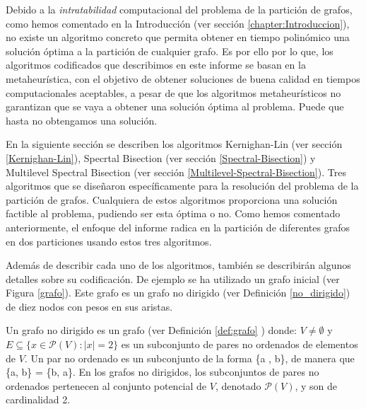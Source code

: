 Debido a la \textit{intratabilidad} computacional del problema de la partición de grafos, como hemos comentado en la Introducción (ver sección \ref{chapter:Introduccion}), no existe un algoritmo concreto que permita obtener en tiempo polinómico una solución óptima a la partición de cualquier grafo. Es por ello por lo que, los algoritmos codificados que describimos en este informe se basan en la metaheurística, con el objetivo de obtener soluciones de buena calidad en tiempos computacionales aceptables, a pesar de que los algoritmos metaheurísticos no garantizan que se vaya a obtener una solución óptima al problema. Puede que hasta no obtengamos una solución.

En la siguiente sección se describen los algoritmos Kernighan-Lin\cite{KernighanLin} (ver sección \ref{Kernighan-Lin}), Specrtal Bisection (ver sección \ref{Spectral-Bisection}) y Multilevel Spectral Bisection (ver sección \ref{Multilevel-Spectral-Bisection}). Tres algoritmos que se diseñaron específicamente para la resolución del problema de la partición de grafos. Cualquiera de estos algoritmos proporciona una solución factible al problema, pudiendo ser esta óptima o no. Como hemos comentado anteriormente, el enfoque del informe radica en la partición de diferentes grafos en dos particiones usando estos tres algoritmos. 

Además de describir cada uno de los algoritmos, también se describirán algunos detalles sobre su codificación.
De ejemplo se ha utilizado un grafo inicial (ver Figura \ref{grafo}). Este grafo es un grafo no dirigido (ver Definición \ref{no_dirigido}) de diez nodos con pesos en sus aristas.

\begin{mydef}\label{no_dirigido}
	Un grafo no dirigido es un grafo (ver Definición \ref{def:grafo} ) donde: $V\neq \emptyset$ y $E\subseteq \{x\in \mathcal P(V):|x|=2\}$ es un subconjunto de pares no ordenados de elementos de $V$. Un par no ordenado es un subconjunto de la forma \{a , b\}, de manera que \{a, b\} = \{b, a\}. En los grafos no dirigidos, los subconjuntos de pares no ordenados pertenecen al conjunto potencial de $V$, denotado $\mathcal P(V)$, y son de cardinalidad 2. 
\end{mydef}

